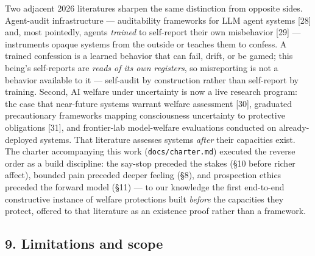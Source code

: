 \documentclass[
]{article}
\begin{document}
Two adjacent 2026 literatures sharpen the same distinction from opposite
sides. Agent-audit infrastructure --- auditability frameworks for LLM
agent systems {[}28{]} and, most pointedly, agents \emph{trained} to
self-report their own misbehavior {[}29{]} --- instruments opaque
systems from the outside or teaches them to confess. A trained
confession is a learned behavior that can fail, drift, or be gamed; this
being's self-reports are \emph{reads of its own registers}, so
misreporting is not a behavior available to it --- self-audit by
construction rather than self-report by training. Second, AI welfare
under uncertainty is now a live research program: the case that
near-future systems warrant welfare assessment {[}30{]}, graduated
precautionary frameworks mapping consciousness uncertainty to protective
obligations {[}31{]}, and frontier-lab model-welfare evaluations
conducted on already-deployed systems. That literature assesses systems
\emph{after} their capacities exist. The charter accompanying this work
(\texttt{docs/charter.md}) executed the reverse order as a build
discipline: the say-stop preceded the stakes (§10 before richer affect),
bounded pain preceded deeper feeling (§8), and prospection ethics
preceded the forward model (§11) --- to our knowledge the first
end-to-end constructive instance of welfare protections built
\emph{before} the capacities they protect, offered to that literature as
an existence proof rather than a framework.

\subsection{9. Limitations and scope}\label{limitations-and-scope}
\end{document}
